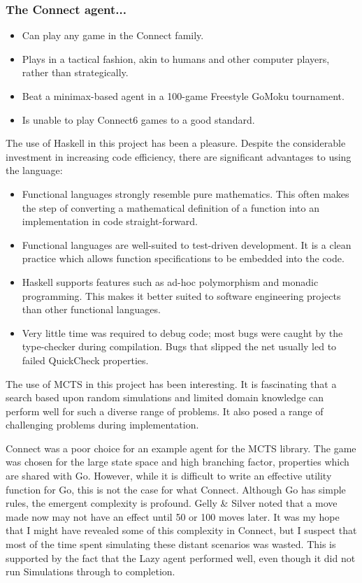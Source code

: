 \subsubsection{The {Connect} agent...}
\begin{itemize}
\item[] Can play any game in the {Connect} family.
\item[] Plays in a tactical fashion, akin to humans and other computer players, rather than strategically.
\item[] Beat a minimax-based agent in a 100-game {Freestyle GoMoku} tournament.
\item[] Is unable to play {Connect6} games to a good standard.
\end{itemize}
The use of Haskell in this project has been a pleasure. Despite the considerable investment in increasing code efficiency, there are significant advantages to using the language:
\begin{itemize}
\item[] Functional languages strongly resemble pure mathematics. This often makes the step of converting a mathematical definition of a function into an implementation in code straight-forward.
\item[] Functional languages are well-suited to test-driven development. It is a clean practice which allows function specifications to be embedded into the code.
\item[] Haskell supports features such as ad-hoc polymorphism and monadic programming. This makes it better suited to software engineering projects than other functional languages.
\item[] Very little time was required to debug code; most bugs were caught by the type-checker during compilation. Bugs that slipped the net usually led to failed QuickCheck properties.
\end{itemize}
The use of MCTS in this project has been interesting. It is fascinating that a search based upon random simulations and limited domain knowledge can perform well for such a diverse range of problems. It also posed a range of challenging problems during implementation. 

Connect was a poor choice for an example agent for the MCTS library. The game was chosen for the large state space and high branching factor, properties which are shared with {Go}. However, while it is difficult to write an effective utility function for Go, this is not the case for what {Connect}. Although {Go} has simple rules, the emergent complexity is profound. Gelly \& Silver \cite{go} noted that a move made now may not have an effect until 50 or 100 moves later. It was my hope that I might have revealed some of this complexity in {Connect}, but I suspect that most of the time spent simulating these distant scenarios was wasted. This is supported by the fact that the {Lazy} agent performed well, even though it did not run Simulations through to completion. 

